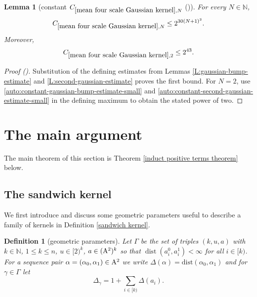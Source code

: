 \documentclass[12pt,reqno]{amsart}
\newcommand{\auto}{{({\tiny\faCar})}}
\theoremstyle{plain}
\newtheorem{lemma}[theorem]{Lemma}
\newtheorem{definition}[theorem]{Definition}
\numberwithin{equation}{section}
\theoremstyle{remark}
\newcommand{\using}[1]{}
\newcommand{\N}{{\mathbb N}}
\DeclareMathOperator{\dist}{dist}
\begin{document}
\begin{lemma}[constant $C_{\ref{mean four scale Gaussian kernel},N}$ \auto]\label{constant mean four scale Gaussian kernel}\using{L:gaussian-bump-estimate}\using{L:second-gaussian-estimate}\using{constant gaussian bump estimate}\using{constant second gaussian estimate}
For every $N\in\N$,
\begin{equation}\label{constant mean four scale Gaussian kernel bound}
C_{\ref{mean four scale Gaussian kernel},N}\le2^{30(N+1)^3}.
\end{equation}
Moreover,
\begin{equation}\label{auto:constant-mean-four-scale-Gaussian-kernel-two}
C_{\ref{mean four scale Gaussian kernel},2}\le2^{43}.
\end{equation}
\end{lemma}
\begin{proof}[Proof \auto]
Substitution of the defining estimates from Lemmas \ref{L:gaussian-bump-estimate} and \ref{L:second-gaussian-estimate} proves the first bound. For $N=2$, use \eqref{auto:constant-gaussian-bump-estimate-small} and \eqref{auto:constant-second-gaussian-estimate-small} in the defining maximum to obtain the stated power of two.
\end{proof}


\section{The main argument}\label{sec:main argument}

The main theorem of this section is Theorem \ref{induct positive terms theorem} below.

\subsection{The sandwich kernel}

We first introduce  and discuss some geometric parameters useful to describe a family of kernels in Definition \ref{sandwich kernel}.

\begin{definition}[geometric parameters]\label{geometric parameters}
  Let $\Gamma$ be the set of triples $(k,u,a)$ with $k\in\N$, $1\le k\le n$, $u\in[2)^k$, $a\in ({\rm A}^{2})^k$  so that $\dist(a_{i}^0,a_{i}^1)<\infty$ for all $i\in [k)$.
  For a sequence pair $\alpha=(\alpha_0,\alpha_1)\in {\rm A}^2$ we write $\Delta(\alpha) = \mathrm{dist}(\alpha_{0}, \alpha_1)$
  and for $\gamma\in\Gamma$ let
  \begin{equation}\label{auto:sandwich-distance-sum} \Delta_\gamma= 1+\sum_{i\in [k)} \Delta(a_i). \end{equation}
\end{definition}
\end{document}
